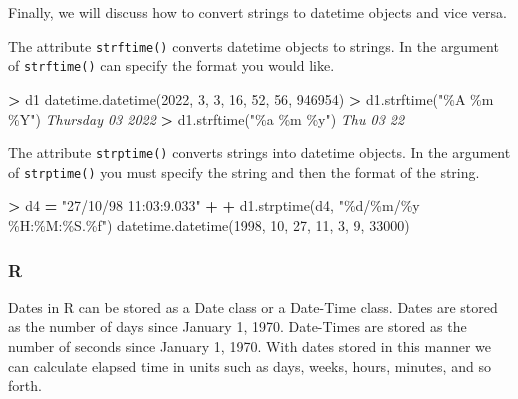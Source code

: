 \documentclass[
]{book}
\newenvironment{Shaded}{\begin{snugshade}}{\end{snugshade}}
\newcommand{\CommentTok}[1]{\textcolor[rgb]{0.56,0.35,0.01}{\textit{#1}}}
\newcommand{\DecValTok}[1]{\textcolor[rgb]{0.00,0.00,0.81}{#1}}
\newcommand{\NormalTok}[1]{#1}
\newcommand{\OperatorTok}[1]{\textcolor[rgb]{0.81,0.36,0.00}{\textbf{#1}}}
\newcommand{\SpecialCharTok}[1]{\textcolor[rgb]{0.00,0.00,0.00}{#1}}
\newcommand{\StringTok}[1]{\textcolor[rgb]{0.31,0.60,0.02}{#1}}
\begin{document}
Finally, we will discuss how to convert strings to datetime objects and vice versa.

The attribute \texttt{strftime()} converts datetime objects to strings. In the argument of \texttt{strftime()} can specify the format you would like.

\begin{Shaded}
\begin{Highlighting}[]
\OperatorTok{\textgreater{}}\NormalTok{ d1}
\NormalTok{datetime.datetime(}\DecValTok{2022}\NormalTok{, }\DecValTok{3}\NormalTok{, }\DecValTok{3}\NormalTok{, }\DecValTok{16}\NormalTok{, }\DecValTok{52}\NormalTok{, }\DecValTok{56}\NormalTok{, }\DecValTok{946954}\NormalTok{)}
\OperatorTok{\textgreater{}}\NormalTok{ d1.strftime(}\StringTok{"\%A \%m \%Y"}\NormalTok{)}
\CommentTok{\textquotesingle{}Thursday 03 2022\textquotesingle{}}
\OperatorTok{\textgreater{}}\NormalTok{ d1.strftime(}\StringTok{"\%a \%m \%y"}\NormalTok{)}
\CommentTok{\textquotesingle{}Thu 03 22\textquotesingle{}}
\end{Highlighting}
\end{Shaded}

The attribute \texttt{strptime()} converts strings into datetime objects. In the argument of \texttt{strptime()} you must specify the string and then the format of the string.

\begin{Shaded}
\begin{Highlighting}[]
\OperatorTok{\textgreater{}}\NormalTok{ d4 }\OperatorTok{=} \StringTok{"27/10/98 11:03:9.033"}
\OperatorTok{+} 
\OperatorTok{+}\NormalTok{ d1.strptime(d4, }\StringTok{"}\SpecialCharTok{\%d}\StringTok{/\%m/\%y \%H:\%M:\%S.}\SpecialCharTok{\%f}\StringTok{"}\NormalTok{)}
\NormalTok{datetime.datetime(}\DecValTok{1998}\NormalTok{, }\DecValTok{10}\NormalTok{, }\DecValTok{27}\NormalTok{, }\DecValTok{11}\NormalTok{, }\DecValTok{3}\NormalTok{, }\DecValTok{9}\NormalTok{, }\DecValTok{33000}\NormalTok{)}
\end{Highlighting}
\end{Shaded}

\hypertarget{r-28}{%
\subsubsection*{R}\label{r-28}}

Dates in R can be stored as a Date class or a Date-Time class. Dates are stored as the number of days since January 1, 1970. Date-Times are stored as the number of seconds since January 1, 1970. With dates stored in this manner we can calculate elapsed time in units such as days, weeks, hours, minutes, and so forth.
\end{document}
